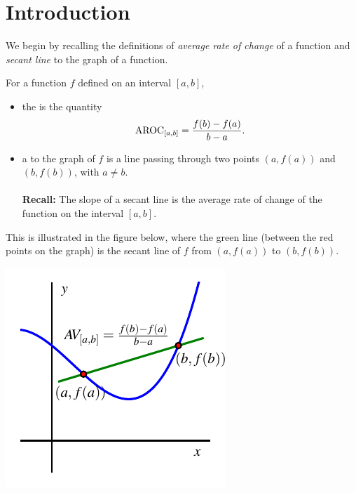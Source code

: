 \documentclass{ximera}
\begin{document}
\section{Introduction}
%
We begin by recalling the definitions of \textit{average rate of change} of a function and {\it secant line} to the graph of a function. 
\begin{definition}
For a function $f$ defined on an interval $[a,b]$, 
\begin{itemize}
\item the  is the quantity%
\begin{equation*}
\mathrm{AROC}_{[a,b]} = \frac{f(b) - f(a)}{b-a}\text{.}
\end{equation*}

\item a  to the graph of $f$ is a line passing through two points $(a,f(a))$ and $(b,f(b))$, with $a \neq b$. \\
\\
  {\bf Recall:} The slope of a secant line is the average rate of change of the function on the interval $[a,b]$.
\end{itemize}

This is illustrated in the figure below, where the green line (between the red points on the graph) is the secant line of $f$ from $(a,f(a))$ to $(b,f(b))$.

\begin{image}
\includegraphics{aroc-f-x-defn.pdf}
\end{image}

\end{definition}
\end{document}
